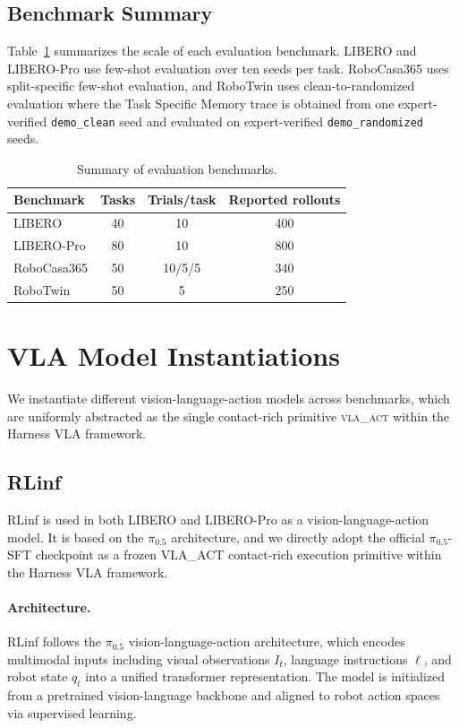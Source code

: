 \documentclass{article}
\begin{document}
\subsection{Benchmark Summary}
\label{app:benchmark_summary}

Table~\ref{tab:app_benchmark_summary} summarizes the scale of each evaluation benchmark. LIBERO and LIBERO-Pro use few-shot evaluation over ten seeds per task. RoboCasa365 uses split-specific few-shot evaluation, and RoboTwin uses clean-to-randomized evaluation where the Task Specific Memory trace is obtained from one expert-verified \texttt{demo\_clean} seed and evaluated on expert-verified \texttt{demo\_randomized} seeds.

\begin{table}[h]
    \centering
    \caption{Summary of evaluation benchmarks.}
    \label{tab:app_benchmark_summary}
    \begin{tabular}{lccc}
        \toprule
        Benchmark & Tasks & Trials/task & Reported rollouts \\
        \midrule
        LIBERO & 40 & 10 & 400 \\
        LIBERO-Pro & 80 & 10 & 800 \\
        RoboCasa365 & 50 & 10/5/5 & 340 \\
        RoboTwin & 50 & 5 & 250 \\
        \bottomrule
    \end{tabular}
\end{table}

\section{VLA Model Instantiations}
\label{app:vla_instantiations}

We instantiate different vision-language-action models across benchmarks, which are uniformly abstracted as the single contact-rich primitive \textsc{vla\_act} within the Harness VLA framework.
\subsection{RLinf}

RLinf is used in both LIBERO and LIBERO-Pro as a vision-language-action model. It is based on the $\pi_{0.5}$ architecture, and we directly adopt the official $\pi_{0.5}$-SFT checkpoint as a frozen VLA\_ACT contact-rich execution primitive within the Harness VLA framework.

\paragraph{Architecture.}
RLinf follows the $\pi_{0.5}$ vision-language-action architecture, which encodes multimodal inputs including visual observations $I_t$, language instructions $\ell$, and robot state $q_t$ into a unified transformer representation. The model is initialized from a pretrained vision-language backbone and aligned to robot action spaces via supervised learning.
\end{document}

